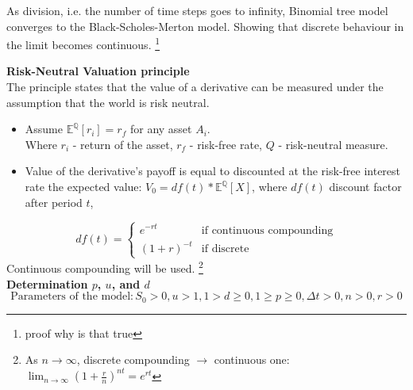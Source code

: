 \documentclass[11pt]{article}
\begin{document}
As division, i.e. the number of time steps goes to infinity, Binomial tree model converges to the Black-Scholes-Merton model. Showing that discrete behaviour in the limit becomes continuous. \footnote{proof why is that true}

\newpage
\textbf{Risk-Neutral Valuation principle}\\
The principle states that the value of a derivative can be measured under the assumption that the world is risk neutral.
\begin{itemize}
    \item Assume $\mathbb{E^Q}{[r_i]} = r_f$ for any asset $A_i$.\\ Where $r_i$ - return of the asset, $r_f$ - risk-free rate, $Q$ - risk-neutral measure.
    \item Value of the derivative's payoff is equal to discounted at the risk-free interest rate the expected value: $V_0 = df(t) * \mathbb{E^Q}{[X]}$, where $df(t)$ discount factor after period $t$,
\end{itemize}
\[
df(t) = \begin{cases} e^{-rt} & \mbox{if continuous compounding}\\ 
(1+r)^{-t} & \mbox{if discrete} \end{cases}
\]  
Continuous compounding will be used. \footnote{As $n\to\infty$, discrete compounding $\to$ continuous one: $\lim_{n\to\infty} (1+\frac{r}{n})^{nt} = e^{rt}$}\\

\textbf{Determination $p$, $u$, and $d$}
\begin{equation}
\label{eqn:param}
\text{Parameters of the model}: S_0 > 0, u > 1, 1 > d \geqslant 0, 1 \geqslant p \geqslant 0, \Delta{t} > 0, n > 0, r > 0
\end{equation}
\end{document}
